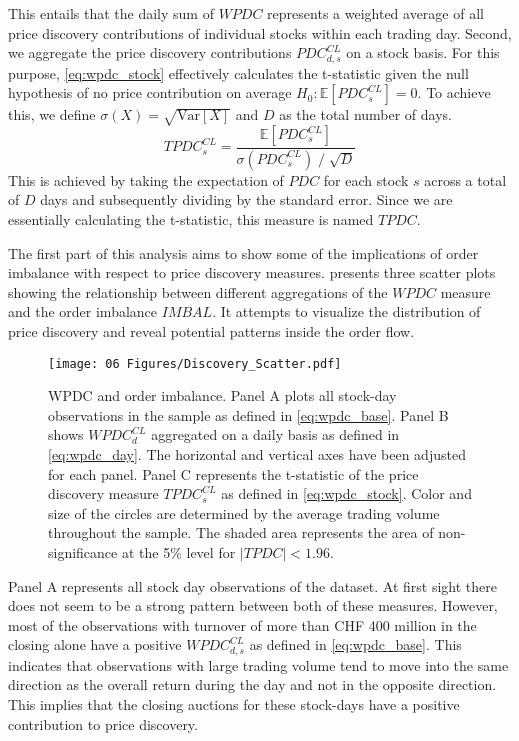 \documentclass[11pt,a4paper, notitlepage]{article}
\begin{document}
	This entails that the daily sum of $WPDC$ represents a weighted average of all price discovery contributions of individual stocks within each trading day. Second, we aggregate the price discovery contributions $PDC^{CL}_{d,s}$ on a stock basis. For this purpose, \cref{eq:wpdc_stock} effectively calculates the t-statistic given the null hypothesis of no price contribution on average $H_0: \mathbb{E}\left[  PDC^{CL}_{s} \right] = 0$. To achieve this, we define $\sigma (X) = \sqrt{ \text{Var} \left[ X \right] }$ and $D$ as the total number of days.
	\begin{equation}
		\label{eq:wpdc_stock}
		TPDC^{CL}_{s} =  \frac{\mathbb{E} \left[  PDC^{CL}_{s} \right] }{ \sigma \left( PDC^{CL}_{s} \right) \; / \; \sqrt{D}}
	\end{equation}
	This is achieved by taking the expectation of $PDC$ for each stock $s$ across a total of $D$ days and subsequently dividing by the standard error.
	Since we are essentially calculating the t-statistic, this measure is named $TPDC$.
	
	
	The first part of this analysis aims to show some of the implications of order imbalance with respect to price discovery measures.  presents three scatter plots showing the relationship between different aggregations of the $WPDC$ measure and the order imbalance $IMBAL$. It attempts to visualize the distribution of price discovery and reveal potential patterns inside the order flow.
	
	\begin{figure}[htp]
		\centering
		\texttt{[image: 06 Figures/Discovery\_Scatter.pdf]}
		\caption{\ac{WPDC} and order imbalance. Panel A plots all stock-day observations in the sample as defined in \cref{eq:wpdc_base}. Panel B shows $WPDC^{CL}_d$ aggregated on a daily basis as defined in \cref{eq:wpdc_day}. The horizontal and vertical axes have been adjusted for each panel. Panel C represents the t-statistic of the price discovery measure $TPDC^{CL}_s$ as defined in \cref{eq:wpdc_stock}. Color and size of the circles are determined by the average trading volume throughout the sample. The shaded area represents the area of non-significance at the 5\% level for $| TPDC | < 1.96$. }
		\label{fig:Discovery}
	\end{figure}
	
	Panel A represents all stock day observations of the dataset. At first sight there does not seem to be a strong pattern between both of these measures. However, most of the observations with turnover of more than CHF 400 million in the closing alone have a positive $WPDC^{CL}_{d,s}$ as defined in \cref{eq:wpdc_base}. This indicates that observations with large trading volume tend to move into the same direction as the overall return during the day and not in the opposite direction. This implies that the closing auctions for these stock-days have a positive contribution to price discovery.
	
\end{document}
